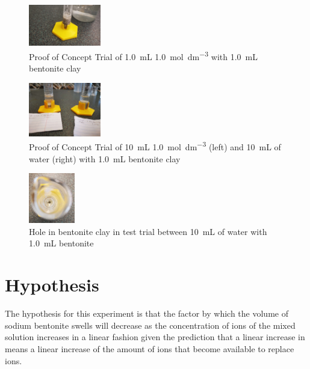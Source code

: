 \documentclass[11pt, letterpaper]{article}
\begin{document}
\begin{paracol}{3}

    \begin{figure}[H]
        \centering
        \includegraphics[width=0.28\textwidth]{poc1MHCL.jpg}
        \caption{Proof of Concept Trial of \SI{1.0}{mL} \SI{1.0}{mol.dm^{-3}}  with \SI{1.0}{mL} bentonite clay}
        \label{fig:poc1MHCL}
    \end{figure}
    \switchcolumn


    \begin{figure}[H]
        \centering
        \includegraphics[width=0.28\textwidth]{betterPOC.jpg}
        \caption{Proof of Concept Trial of \SI{10}{mL} \SI{1.0}{mol.dm^{-3}}  (left) and \SI{10}{mL} of water (right) with \SI{1.0}{mL} bentonite clay}
        \label{fig:betterPOC}
    \end{figure}

    \switchcolumn
    \begin{figure}[H]
        \centering
        \includegraphics[width=0.18\textwidth]{hole.jpg}
        \caption{Hole in bentonite clay in test trial between \SI{10}{mL} of water with \SI{1.0}{mL} bentonite}
        \label{fig:hole}
    \end{figure}

\end{paracol}

\section{Hypothesis}

The hypothesis for this experiment is that
the factor by which the volume of
sodium bentonite swells will decrease as the concentration of  ions of the mixed
solution increases in a linear fashion
given the prediction that a linear increase in \ce{[H+]} means a linear increase
of the amount of  ions that become available to replace  ions.
\end{document}
